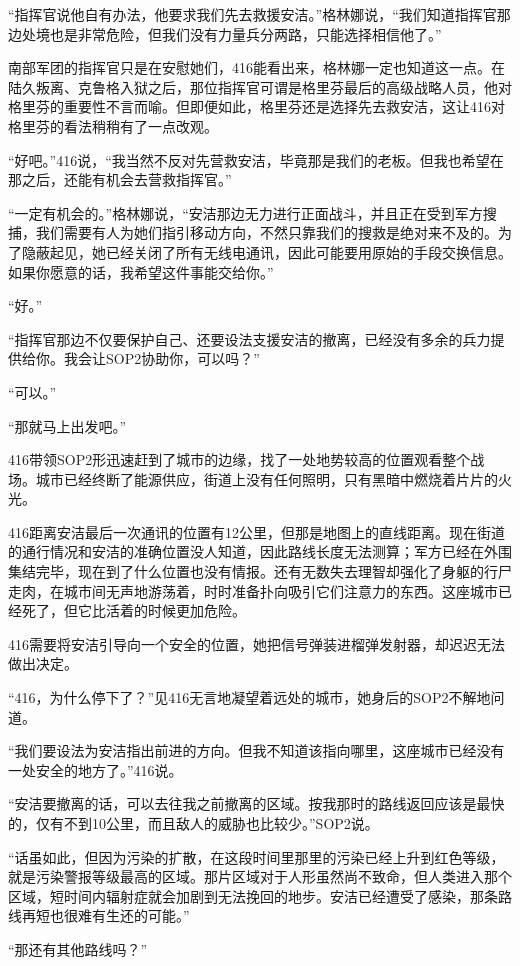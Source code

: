 “指挥官说他自有办法，他要求我们先去救援安洁。”格林娜说，“我们知道指挥官那边处境也是非常危险，但我们没有力量兵分两路，只能选择相信他了。”

南部军团的指挥官只是在安慰她们，416能看出来，格林娜一定也知道这一点。在陆久叛离、克鲁格入狱之后，那位指挥官可谓是格里芬最后的高级战略人员，他对格里芬的重要性不言而喻。但即便如此，格里芬还是选择先去救安洁，这让416对格里芬的看法稍稍有了一点改观。

“好吧。”416说，“我当然不反对先营救安洁，毕竟那是我们的老板。但我也希望在那之后，还能有机会去营救指挥官。”

“一定有机会的。”格林娜说，“安洁那边无力进行正面战斗，并且正在受到军方搜捕，我们需要有人为她们指引移动方向，不然只靠我们的搜救是绝对来不及的。为了隐蔽起见，她已经关闭了所有无线电通讯，因此可能要用原始的手段交换信息。如果你愿意的话，我希望这件事能交给你。”

“好。”

“指挥官那边不仅要保护自己、还要设法支援安洁的撤离，已经没有多余的兵力提供给你。我会让SOP2协助你，可以吗？”

“可以。”

“那就马上出发吧。”

416带领SOP2形迅速赶到了城市的边缘，找了一处地势较高的位置观看整个战场。城市已经终断了能源供应，街道上没有任何照明，只有黑暗中燃烧着片片的火光。

416距离安洁最后一次通讯的位置有12公里，但那是地图上的直线距离。现在街道的通行情况和安洁的准确位置没人知道，因此路线长度无法测算；军方已经在外围集结完毕，现在到了什么位置也没有情报。还有无数失去理智却强化了身躯的行尸走肉，在城市间无声地游荡着，时时准备扑向吸引它们注意力的东西。这座城市已经死了，但它比活着的时候更加危险。

416需要将安洁引导向一个安全的位置，她把信号弹装进榴弹发射器，却迟迟无法做出决定。

“416，为什么停下了？”见416无言地凝望着远处的城市，她身后的SOP2不解地问道。

“我们要设法为安洁指出前进的方向。但我不知道该指向哪里，这座城市已经没有一处安全的地方了。”416说。

“安洁要撤离的话，可以去往我之前撤离的区域。按我那时的路线返回应该是最快的，仅有不到10公里，而且敌人的威胁也比较少。”SOP2说。

“话虽如此，但因为污染的扩散，在这段时间里那里的污染已经上升到红色等级，就是污染警报等级最高的区域。那片区域对于人形虽然尚不致命，但人类进入那个区域，短时间内辐射症就会加剧到无法挽回的地步。安洁已经遭受了感染，那条路线再短也很难有生还的可能。”

“那还有其他路线吗？”

